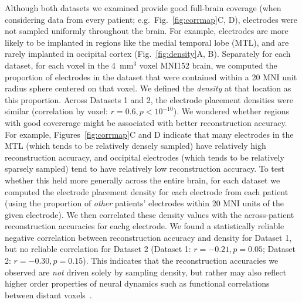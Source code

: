 \documentclass[11pt]{article}
\begin{document}
Although both datasets we examined provide good full-brain coverage
(when considering data from every patient; e.g.\
Fig.~\ref{fig:corrmap}C, D), electrodes were not sampled uniformly
throughout the brain.  For example, electrodes are more likely to be
implanted in regions like the medial temporal lobe (MTL), and are
rarely implanted in occipital cortex (Fig.~\ref{fig:density}A, B).
Separately for each dataset, for each voxel in the 4~mm$^3$ voxel
MNI152 brain, we computed the proportion of electrodes in the dataset
that were contained within a 20 MNI unit radius sphere centered on
that voxel.  We defined the \textit{density} at that location as this
proportion.  Across Datasets 1 and 2, the electrode placement
densities were similar (correlation by voxel:
$r = 0.6, p < 10^{-10}$).  We wondered whether regions with good
covererage might be associated with better reconstruction accuracy.
For example, Figures~\ref{fig:corrmap}C and D indicate that many
electrodes in the MTL (which tends to be relatively densely sampled)
have relatively high reconstruction accuracy, and occipital electrodes
(which tends to be relatively sparsely sampled) tend to have
relatively low reconstruction accuracy.  To test whether this held
more generally across the entire brain, for each dataset we computed
the electrode placement density for each electrode from each patient
(using the proportion of \textit{other} patients' electrodes within 20
MNI units of the given electrode).  We then correlated these density
values with the across-patient reconstruction accuracies for eachg
electrode.  We found a statistically reliable negative correlation
between reconstruction accuracy and density for Dataset 1, but no
reliable correlation for Dataset 2 (Dataset 1: $r = -0.21, p = 0.05$;
Dataset 2: $r = -0.30, p = 0.15$).  This indicates that the
reconstruction accuracies we observed are \textit{not} driven solely
by sampling density, but rather may also reflect higher order
properties of neural dynamics such as functional correlations between
distant voxels~\citep{BetzEtal17b}.
\end{document}
